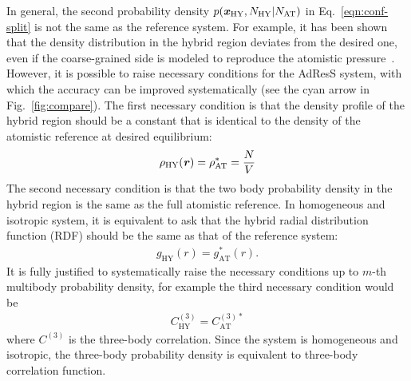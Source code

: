 \documentclass[epjST]{svjour}
\newcommand{\vect}[1]{\textbf{\textit{#1}}}
\newcommand{\AT}[0]{\textrm{AT}}
\newcommand{\HY}[0]{\textrm{HY}}
\begin{document}
In general, the second probability density $p(\vect x_\HY, N_\HY\vert N_\AT)$ in Eq.~\eqref{eqn:conf-split} 
is not the same as the reference system.  For example, it has been
shown that the density distribution in the hybrid region deviates from
the desired one, even if the coarse-grained side is modeled to
reproduce the atomistic pressure~\cite{poblete2010coupling}.  However,
it is possible to raise necessary conditions
for the AdResS system, with which the accuracy can be improved
systematically (see the cyan arrow in Fig.~\ref{fig:compare}).
The first necessary
condition is that the density profile of the hybrid region should be a
constant that is identical to the density of the atomistic reference
at desired equilibrium:
\begin{align}\label{eqn:necessary-1st}
  \rho_\HY(\vect r) = \rho_\AT^\ast = \frac NV
\end{align}
The second necessary condition is that the two body probability
density in the hybrid region is the same as the full atomistic
reference. In homogeneous and isotropic system, it is equivalent to
ask that the hybrid radial distribution function (RDF) should be the
same as that of the reference system:
\begin{align}\label{eqn:necessary-2nd}
  g_\HY(r) = g^\ast_\AT(r).
\end{align}
It is fully justified to systematically raise the necessary conditions
up to $m$-th multibody probability density, for example the third necessary condition would be
\begin{align}
  C^{(3)}_\HY = C^{(3)\ast}_\AT
\end{align}
where $C^{(3)}$ is the three-body correlation.
Since the system is homogeneous
and isotropic, the three-body probability density is equivalent to
three-body correlation function. 
\end{document}
